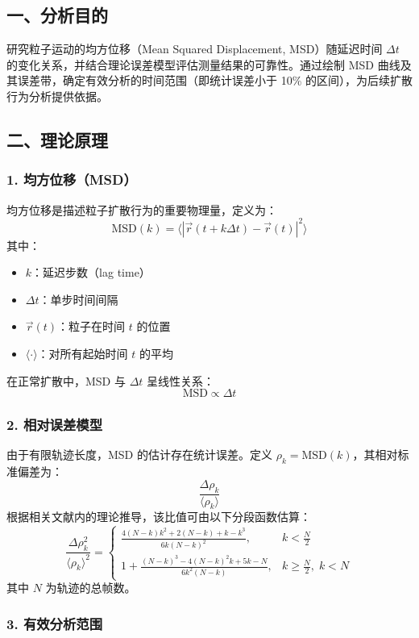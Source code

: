 \documentclass[a4paper]{report} %
\begin{document}
\subsection*{一、分析目的}

研究粒子运动的均方位移（Mean Squared Displacement, MSD）随延迟时间 $\Delta t$ 的变化关系，并结合理论误差模型评估测量结果的可靠性。通过绘制 MSD 曲线及其误差带，确定有效分析的时间范围（即统计误差小于 10\% 的区间），为后续扩散行为分析提供依据。

\subsection*{二、理论原理}
\subsubsection*{1. 均方位移（MSD）}
均方位移是描述粒子扩散行为的重要物理量，定义为：
\[
\text{MSD}(k) = \langle |\vec{r}(t + k\Delta t) - \vec{r}(t)|^2 \rangle
\]
其中：
\begin{itemize}
    \item $k$：延迟步数（lag time）
    \item $\Delta t$：单步时间间隔
    \item $\vec{r}(t)$：粒子在时间 $t$ 的位置
    \item $\langle \cdot \rangle$：对所有起始时间 $t$ 的平均
\end{itemize}
在正常扩散中，MSD 与 $\Delta t$ 呈线性关系：
\[
\text{MSD} \propto \Delta t
\]
\subsubsection*{2. 相对误差模型}
由于有限轨迹长度，MSD 的估计存在统计误差。定义 $\rho_k = \text{MSD}(k)$，其相对标准偏差为：
\[
\frac{\Delta \rho_k}{\langle \rho_k \rangle}
\]
根据相关文献内的理论推导\cite{qian1991spt}，该比值可由以下分段函数估算：
\[
\frac{\Delta \rho_k^2}{\langle \rho_k \rangle^2} =
\begin{cases}
\displaystyle \frac{4(N-k)k^2 + 2(N-k) + k - k^3}{6k(N-k)^2}, & k < \tfrac{N}{2} \\[2ex]
\displaystyle 1 + \frac{(N-k)^3 - 4(N-k)^2 k + 5k - N}{6k^2(N-k)}, & k \geq \tfrac{N}{2},\; k < N
\end{cases}
\]
其中 $N$ 为轨迹的总帧数。

\subsubsection*{3. 有效分析范围}
\end{document}

